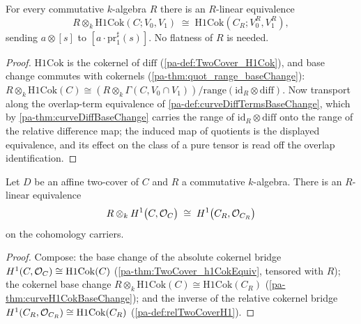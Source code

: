 \begin{theorem}
  \label{pa-thm:curveH1CokBaseChange}
  \leanok

  For every commutative \(k\)-algebra \(R\) there is an \(R\)-linear equivalence
  \[
    R \otimes_k \mathrm{H1Cok}(C; V_0, V_1) \;\cong\;
      \mathrm{H1Cok}(C_R; V_0^R, V_1^R),
  \]
  sending \(a \otimes [s]\) to \([a \cdot \mathrm{pr}_1^\sharp(s)]\). No flatness of
  \(R\) is needed.
\end{theorem}
\begin{proof}
  \leanok
  \(\mathrm{H1Cok}\) is the cokernel of \(\mathrm{diff}\) (\ref{pa-def:TwoCover_H1Cok}),
  and base change commutes with cokernels (\ref{pa-thm:quot_range_baseChange}):
  \(R \otimes_k \mathrm{H1Cok}(C) \cong (R \otimes_k \Gamma(C, V_0 \cap V_1)) /
  \mathrm{range}(\mathrm{id}_R \otimes \mathrm{diff})\). Now transport along the
  overlap-term equivalence of \ref{pa-def:curveDiffTermsBaseChange}, which by
  \ref{pa-thm:curveDiffBaseChange} carries the range of
  \(\mathrm{id}_R \otimes \mathrm{diff}\) onto the range of the relative difference
  map; the induced map of quotients is the displayed equivalence, and its effect on the
  class of a pure tensor is read off the overlap identification.
\end{proof}

\begin{theorem}
  \label{pa-thm:curveH1BaseChange}
  \leanok

  Let \(D\) be an affine two-cover of \(C\) and \(R\) a commutative \(k\)-algebra.
  There is an \(R\)-linear equivalence
  \[
    R \otimes_k H^1\bigl(C, \mathcal{O}_{C}\bigr) \;\cong\;
      H^1\bigl(C_R, \mathcal{O}_{C_R}\bigr)
  \]
  on the cohomology carriers.
\end{theorem}
\begin{proof}
  \leanok
  Compose: the base change of the absolute cokernel bridge
  \(H^1(C, \mathcal{O}_{C}) \cong \mathrm{H1Cok}(C)\) (\ref{pa-thm:TwoCover_h1CokEquiv},
  tensored with \(R\)); the cokernel base change
  \(R \otimes_k \mathrm{H1Cok}(C) \cong \mathrm{H1Cok}(C_R)\)
  (\ref{pa-thm:curveH1CokBaseChange}); and the inverse of the relative cokernel bridge
  \(H^1(C_R, \mathcal{O}_{C_R}) \cong \mathrm{H1Cok}(C_R)\) (\ref{pa-def:relTwoCoverH1}).
\end{proof}

